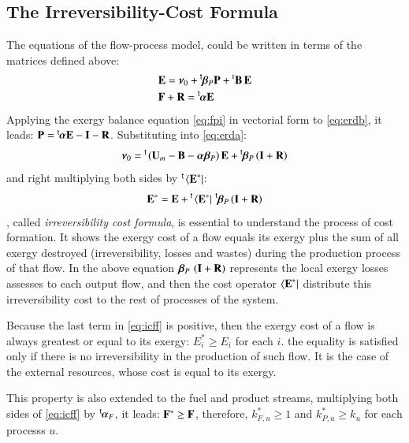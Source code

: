 \documentclass{ecos2018}
\begin{document}
\subsection{The Irreversibility-Cost Formula}
The equations of the flow-process model, could be written in terms of the matrices defined above:
\begin{align}
&\mathbf{E}=\bm{\nu}_0+\prescript{\smash{\mathsf{t}}}{}{\mskip-1mu}\bm{\beta}_P\mathbf{P}+\prescript{\smash{\mathrm{t}}}{}{\mathbf{B}}\,\mathbf{E} \label{eq:erda}\\
&\mathbf{F}+\mathbf{R}=\prescript{\smash{\mathsf{t}}}{}{\mskip-1mu}\bm{\alpha}\mathbf{E} \label{eq:erdb}
\end{align}
Applying the exergy balance equation \cref{eq:fpi} in vectorial form to \cref{eq:erdb}, it leads: ${\mathbf{P}=\prescript{\smash{\mathsf{t}}}{}{\mskip-1mu}\bm{\alpha}\mathbf{E}-\mathbf{I}-\mathbf{R}}$. Substituting into \cref{eq:erda}:
\begin{equation}
\bm{\nu}_0=\prescript{\smash{\mathsf{t}}}{}{\mskip-1mu}\left(\mathbf{U}_m-\mathbf{B}-\bm{\alpha}\bm{\beta}_P\right)\mathbf{E}+\prescript{\smash{\mathsf{t}}}{}{\mskip-1mu}\bm{\beta}_P\left(\mathbf{I}+\mathbf{R}\right)
\end{equation}
and right multiplying both sides by $\prescript{\smash{\mathsf{t}}}{}{\mskip-1mu}\left\langle {\textbf{E}^\ast } \right|$:
\begin{equation}
\label{eq:icff}
\mathbf{E}^*=\mathbf{E}+\prescript{\smash{\mathsf{t}}}{}{\mskip-1mu}\left\langle {\textbf{E}^\ast } \right|\,\prescript{\smash{\mathsf{t}}}{}{\mskip-1mu}\bm{\beta}_P\left(\mathbf{I}+\mathbf{R}\right)
\end{equation}
, called \emph{irreversibility cost formula}, is essential to understand the process of cost formation. It shows the exergy cost of a flow equals its exergy plus the sum of all exergy destroyed (irreversibility, losses and wastes) during the production process of that flow. In the above equation $\bm{\beta}_P\,\left(\mathbf{I}+\mathbf{R}\right)$ represents the local exergy losses assesses to each output flow, and then the cost operator $\left\langle {\textbf{E}^\ast } \right|$  distribute this irreversibility cost to the rest of processes of the system.

Because the last term in \cref{eq:icff} is  positive, then the exergy cost of a flow is always greatest or equal to its exergy: $E_i^* \ge E_i$ for each $i$. the equality is satisfied only if there is no irreversibility in the production of such flow. It is the case of the external resources, whose cost is equal to its exergy. 

This property is also extended to the fuel and product streams, multiplying both sides of \cref{eq:icff} by $\prescript{\smash{\mathsf{t}}}{}{\mskip-1mu}\bm{\alpha}_F$, it leads: $\mathbf{F}^*\ge\mathbf{F}$, therefore, {$k_{F,u}^{*}\ge 1$} and {$k_{P,u}^{*}\ge k_u$} for each processs $u$.
\end{document}
